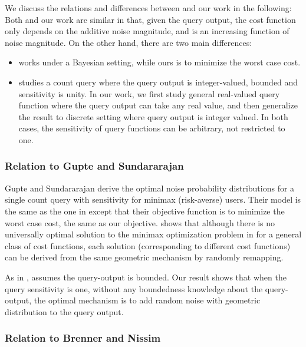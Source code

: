 We discuss the relations and differences between \cite{Ghosh09} and our work in the following: Both \cite{Ghosh09} and our work are similar in that,  given the query output, the cost function only depends on the additive noise magnitude, and is an increasing function of noise magnitude. On the other hand, there are two main differences:
\begin{itemize}

	\item \cite{Ghosh09}  works under a Bayesian setting, while ours is to minimize the worst case cost.

	\item \cite{Ghosh09} studies a count query where the query output is integer-valued, bounded and sensitivity is unity.  In our work,  we first study general real-valued query function where the query output can take any real value, and then generalize the result to discrete setting where query output is integer valued.  In both cases, the sensitivity of query functions can be arbitrary, not restricted to one.
\end{itemize}


\subsubsection{Relation to  Gupte and Sundararajan  \cite{minimax10}  }

  Gupte and Sundararajan \cite{minimax10} derive the optimal noise probability distributions for a single count query with sensitivity  for minimax (risk-averse) users. Their model is the same as the one in \cite{Ghosh09} except that their objective function is to minimize the worst case cost, the same as our objective.  \cite{minimax10} shows that although there is no universally optimal solution to the minimax optimization problem in \cite{minimax10} for a general class of cost functions, each solution (corresponding to different cost functions) can be derived from the same geometric mechanism by randomly remapping.

  As in \cite{Ghosh09}, \cite{minimax10} assumes the query-output is bounded. Our result shows that when the query sensitivity is one, without any boundedness knowledge about the query-output, the optimal mechanism is to add random noise with geometric distribution to the query output.


\subsubsection{Relation to Brenner and Nissim  \cite{Nissim10}  }


